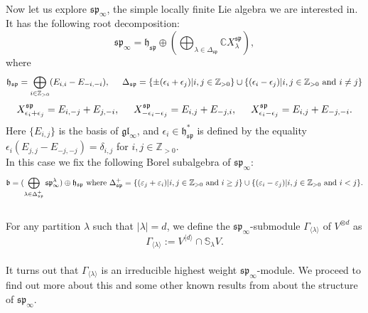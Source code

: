 \\Now let us explore $\mathfrak{sp}_{\infty}$, the simple locally finite Lie algebra we are interested in. It has the following root decomposition:
$$\mathfrak{sp}_{\infty}=\mathfrak{h}_{\mathfrak{sp}}\oplus(\bigoplus_{\lambda \in \Delta_{\mathfrak{sp}}}\mathbb{C} X_{\lambda}^{\mathfrak{sp}}),$$
where
$$\mathfrak{h}_{\mathfrak{sp}}=\bigoplus_{i\in \mathbb{Z}_{>0}}(E_{i,i}-E_{-i,-i}),\hspace{5mm} \Delta_{\mathfrak{sp}}=\{\pm(\epsilon_i+\epsilon_j)|i,j\in\mathbb{Z}_{>0}\}\cup\{(\epsilon_{i}-\epsilon_{j})|i,j\in\mathbb{Z}_{>0} \textnormal{ and } i\ne j\}$$ 
$$X^{\mathfrak{sp}}_{\epsilon_i+\epsilon_j}=E_{i,-j}+E_{j,-i},\hspace{5mm}X^{\mathfrak{sp}}_{-\epsilon_i-\epsilon_j}=E_{i,j}+E_{-j,i},\hspace{5mm}X^{\mathfrak{sp}}_{\epsilon_i-\epsilon_j}=E_{i,j}+E_{-j,-i}.$$
Here $\{E_{i,j}\}$ is the basis of $\mathfrak{gl}_{\infty}$, and  $\epsilon_{i}\in \mathfrak{h}_{\mathfrak{sp}}^{*}$ is defined by the equality  $\epsilon_{i}(E_{j,j}-E_{-j,-j})=\delta_{i,j}$ for $i,j\in \mathbb{Z}_{>0}$.
\vspace{2mm}
\\In this case we fix the following Borel subalgebra of $\mathfrak{sp}_{\infty}$: $$\mathfrak{b}=(\bigoplus_{\lambda\in\Delta^{+}_{\mathfrak{sp}}}\mathfrak{sp}_{\infty}^{\lambda})\oplus\mathfrak{h}_{\mathfrak{sp}} \textnormal{  where  } \Delta_{\mathfrak{sp}}^{+}=\{ (\varepsilon_j+\varepsilon_i)|i,j\in\mathbb{Z}_{>0} \textnormal{ and }i \geq j \}\cup \{(\varepsilon_i-\varepsilon_j)|i,j\in\mathbb{Z}_{>0} \textnormal{ and } i< j\}. $$
\\For any partition $\lambda$ such that $|\lambda|=d$, we define the $\mathfrak{sp}_{\infty}$-submodule $\Gamma_{\langle \lambda \rangle}$ of $V^{\otimes d}$ as
$$\Gamma_{\langle \lambda \rangle}:=V^{\langle d \rangle} \cap \mathbb{S}_{\lambda}V.$$
\\It turns out that $\Gamma_{\langle\lambda\rangle}$ is an irreducible highest weight $\mathfrak{sp}_{\infty}$-module.
We proceed to find out more about this and some other known results from \cite{styrk} about the structure of $\mathfrak{sp}_{\infty}$.

